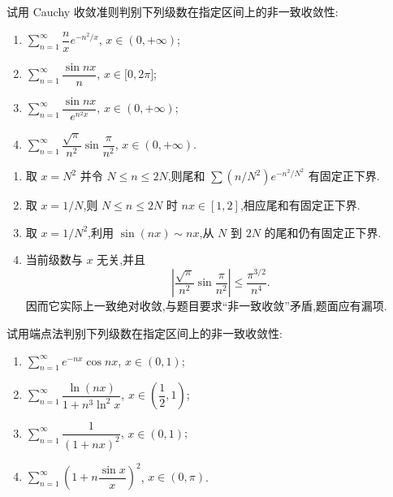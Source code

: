 \begin{example}
    试用 Cauchy 收敛准则判别下列级数在指定区间上的非一致收敛性:
    \begin{enumerate}
        \item $\displaystyle\sum\limits_{n=1}^{\infty}\dfrac{n}{x}e^{-n^2/x}$, $x\in(0,+\infty)$;
        \item $\displaystyle\sum\limits_{n=1}^{\infty}\dfrac{\sin nx}{n}$, $x\in\lbrack 0,2\pi\rbrack$;
        \item $\displaystyle\sum\limits_{n=1}^{\infty}\dfrac{\sin nx}{e^{n^2x}}$, $x\in(0,+\infty)$;
        \item $\displaystyle\sum\limits_{n=1}^{\infty}\dfrac{\sqrt{\pi}}{n^2}\sin\dfrac{\pi}{n^2}$, $x\in(0,+\infty)$.
    \end{enumerate}
\end{example}
\exampleblank

\begin{solution}
    \leavevmode
    \begin{enumerate}
        \item 取 $x=N^2$ 并令 $N\leq n\leq2N$,则尾和
              $\displaystyle\sum(n/N^2)e^{-n^2/N^2}$ 有固定正下界.
        \item 取 $x=1/N$,则 $N\leq n\leq2N$ 时 $nx\in[1,2]$,相应尾和有固定正下界.
        \item 取 $x=1/N^2$,利用 $\sin(nx)\sim nx$,从 $N$ 到 $2N$ 的尾和仍有固定正下界.
        \item 当前级数与 $x$ 无关,并且
              \[
                  \left|\dfrac{\sqrt\pi}{n^2}\sin\dfrac{\pi}{n^2}\right|
                  \leq\dfrac{\pi^{3/2}}{n^4}.
              \]
              因而它实际上一致绝对收敛,与题目要求``非一致收敛''矛盾,题面应有漏项.
    \end{enumerate}
\end{solution}

\begin{example}
    试用端点法判别下列级数在指定区间上的非一致收敛性:
    \begin{enumerate}
        \item $\displaystyle\sum\limits_{n=1}^{\infty}e^{-nx}\cos nx$, $x\in(0,1)$;
        \item $\displaystyle\sum\limits_{n=1}^{\infty}\dfrac{\ln(nx)}{1+n^3\ln^2x}$, $x\in\left(\dfrac{1}{2},1\right)$;
        \item $\displaystyle\sum\limits_{n=1}^{\infty}\dfrac{1}{(1+nx)^2}$, $x\in(0,1)$;
        \item $\displaystyle\sum\limits_{n=1}^{\infty}\left(1+n\dfrac{\sin x}{x}\right)^2$, $x\in(0,\pi)$.
    \end{enumerate}
\end{example}
\exampleblank

